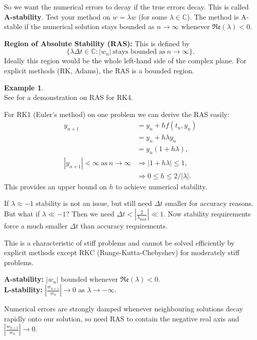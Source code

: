\documentclass[12pt, a4paper]{article}
\theoremstyle{definition}
\newtheorem{example}[thm]{Example}
\theoremstyle{remark}
\numberwithin{equation}{section}
\begin{document}
So we want the numerical errors to decay if the true errors decay. This is called
\textbf{A-stability}. Test your method on $\dot{w} = \lambda w$ (for some
$\lambda \in \mathbb{C}$). The method is A-stable if the numerical solution
stays bounded as $n \rightarrow \infty$ whenever $\mathfrak{Re}(\lambda) < 0$.

\textbf{Region of Absolute Stability (RAS):} This is defined by
$$\{ \lambda \Delta t \in \mathbb{C} : |w_n|\ \text{stays bounded as}\ n \rightarrow \infty \}.$$
Ideally this region would be the whole left-hand side of the complex plane.
For explicit methods (RK, Adams), the RAS is a bounded region. 

\begin{example} \ \\
See  for a demonstration on RAS for RK4.
\end{example} 

For RK1 (Euler's method) on one problem we can derive the RAS easily:
\begin{align*}
y_{n+1} &= y_n + hf(t_n, y_n) \\
        &= y_n + h\lambda y_n \\
        &= y_n(1 + h\lambda), \\
\left|y_{n+1}\right| < \infty\ \text{as}\ n \rightarrow \infty &
\Rightarrow |1 + h\lambda| \le 1, \\
& \Rightarrow 0 \le h \le 2/|\lambda|.
\end{align*}
This provides an upper bound on $h$ to achieve numerical stability.


If $\lambda \approx -1$ stability is not an issue, but still need $\Delta t$
smaller for accuracy reasons. But what if $\lambda \ll -1$? Then we need
$\Delta t < \left|\frac{2}{\lambda_\mathrm{max}}\right| \ll 1$. Now
stability requirements force a much smaller $\Delta t$ than accuracy requirements.

This is a characteristic of stiff problems and cannot be solved efficiently
by explicit methods except RKC (Runge-Kutta-Chebyshev) for moderately stiff problems.


\textbf{A-stability:} $|w_n|$ bounded whenever $\mathfrak{Re}(\lambda) < 0$. \\
\textbf{L-stability:} $\left| \frac{w_{n+1}}{w_n}\right| \rightarrow 0$ as
$\lambda \rightarrow -\infty$.


Numerical errors are strongly damped whenever neighbouring solutions
decay rapidly onto our solution, so need RAS to contain the negative real
axis and $\left| \frac{w_{n+1}}{w_n}\right| \rightarrow 0$.
\end{document}
